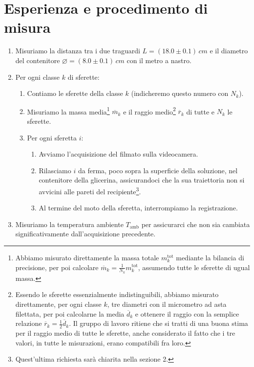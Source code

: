 \documentclass{article}
\newcommand*{\diam}{\varnothing}
\begin{document}
\pagebreak
\section{Esperienza e procedimento di misura}

\begin{enumerate}
  \item Misuriamo la distanza tra i due traguardi $L = (18.0\pm0.1)\,\unit{cm}$
    e il diametro del contenitore $\diam = (8.0\pm0.1)\,\unit{cm}$
    con il metro a nastro.
  \item Per ogni classe $k$ di sferette:
  \begin{enumerate}
    \item
      Contiamo le sferette della classe $k$ (indicheremo questo numero
      con $N_k$).
    \item
      Misuriamo la massa media\footnote{
        Abbiamo misurato direttamente la massa totale $m_k^\text{tot}$
        mediante la bilancia di precisione, per poi calcolare
        $\overline{m}_k = \frac{1}{N_k} m_k^\text{tot}$,
        assumendo tutte le sferette di ugual massa.
      } $\overline{m}_k$ e il raggio medio\footnote{
        Essendo le sferette essenzialmente indistinguibili, abbiamo
        misurato direttamente, per ogni classe $k$, tre diametri con
        il micrometro ad asta filettata, per poi calcolarne la media
        $\overline{d}_k$ e ottenere il raggio con la semplice
        relazione $\overline{r}_k = \frac{1}{2} \overline{d}_k$.
        Il gruppo di lavoro ritiene che si tratti di una buona stima
        per il raggio medio di tutte le sferette, anche considerato
        il fatto che i tre valori, in tutte le misurazioni, erano
        compatibili fra loro.
      } $\overline{r}_k$ di tutte e $N_k$ le sferette.
    \item Per ogni sferetta $i$:
    \begin{enumerate}
      \item
        Avviamo l'acquisizione del filmato sulla videocamera.
      \item
        Rilasciamo $i$ da ferma, poco sopra la superficie della soluzione,
        nel contenitore della glicerina, assicurandoci che la sua traiettoria
        non si avvicini alle pareti del recipiente\footnote{
          Quest'ultima richiesta sarà chiarita nella sezione 2.
        }.
      \item
        Al termine del moto della sferetta, interrompiamo la registrazione.
    \end{enumerate}
  \end{enumerate}
  \item Misuriamo la temperatura ambiente $T_\text{amb}$ per assicurarci
    che non sia cambiata significativamente dall'acquisizione precedente.
\end{enumerate}
\end{document}
